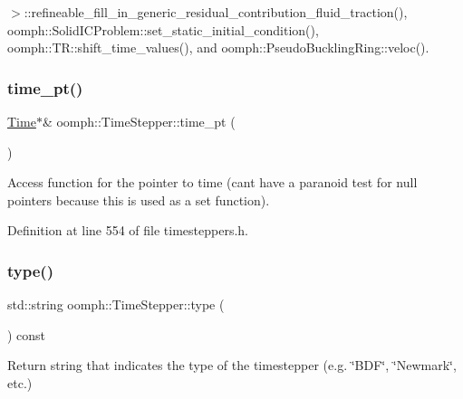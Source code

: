 $>$\+::refineable\+\_\+fill\+\_\+in\+\_\+generic\+\_\+residual\+\_\+contribution\+\_\+fluid\+\_\+traction(), oomph\+::\+Solid\+I\+C\+Problem\+::set\+\_\+static\+\_\+initial\+\_\+condition(), oomph\+::\+T\+R\+::shift\+\_\+time\+\_\+values(), and oomph\+::\+Pseudo\+Buckling\+Ring\+::veloc().

\mbox{\label{classoomph_1_1TimeStepper_a3219b7e7ccdc37f733961eeb8cce0a49}} 
\subsubsection{\texorpdfstring{time\+\_\+pt()}{time\_pt()}\hspace{0.1cm}{\footnotesize\ttfamily [2/2]}}
{\footnotesize\ttfamily \hyperlink{classoomph_1_1Time}{Time}$\ast$\& oomph\+::\+Time\+Stepper\+::time\+\_\+pt (\begin{DoxyParamCaption}{ }\end{DoxyParamCaption})\hspace{0.3cm}{\ttfamily [inline]}}

Access function for the pointer to time (can\textquotesingle{}t have a paranoid test for null pointers because this is used as a set function). 

Definition at line 554 of file timesteppers.\+h.

\mbox{\label{classoomph_1_1TimeStepper_acbd69b35e54efa29b219bbb56ba49260}} 
\subsubsection{\texorpdfstring{type()}{type()}}
{\footnotesize\ttfamily std\+::string oomph\+::\+Time\+Stepper\+::type (\begin{DoxyParamCaption}{ }\end{DoxyParamCaption}) const\hspace{0.3cm}{\ttfamily [inline]}}



Return string that indicates the type of the timestepper (e.\+g. \char`\"{}\+B\+D\+F\char`\"{}, \char`\"{}\+Newmark\char`\"{}, etc.) 



